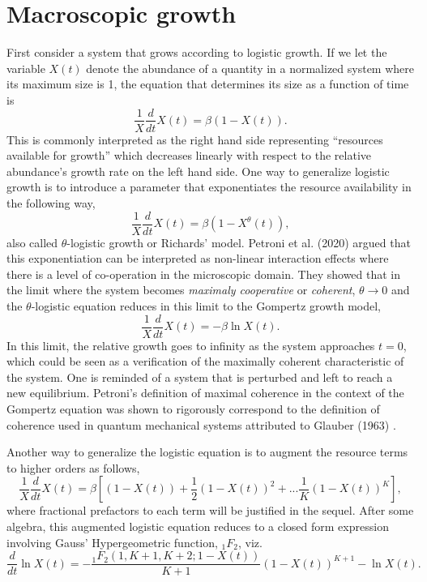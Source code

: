 \documentclass{article}
\begin{document}
\section{Macroscopic growth}
\label{sec:macro}

First consider a system that grows according to logistic growth. If we let the variable $X(t)$ denote the abundance of a quantity in a normalized system where its maximum size is 1, the equation that determines its size as a function of time is
\begin{equation}
  \frac{1}{X}\frac{d}{dt} X(t) = \beta (1 - X(t)).
\end{equation}
This is commonly interpreted as the right hand side representing ``resources available for growth'' which decreases linearly with respect to the relative abundance's growth rate on the left hand side. One way to generalize logistic growth is to introduce a parameter that exponentiates the resource availability in the following way,
\begin{equation}
\label{eq:Rich}
  \frac{1}{X}\frac{d}{dt} X(t) = \beta (1 - X^{\theta}(t)),
\end{equation}
also called $\theta$-logistic growth or Richards' model. Petroni et al. (2020) argued that this exponentiation can be interpreted as non-linear interaction effects where there is a level of co-operation in the microscopic domain. They showed that in the limit where the system becomes \textit{maximaly cooperative} or \textit{coherent}, $\theta\rightarrow 0$ and the $\theta$-logistic equation reduces in this limit to the Gompertz growth model,
 \begin{equation}
 \label{eq:Gomp}
  \frac{1}{X}\frac{d}{dt} X(t) = - \beta \ln X(t).
\end{equation}
In this limit, the relative growth goes to infinity as the system approaches $t=0$, which could be seen as a verification of the maximally coherent characteristic of the system. One is reminded of a system that is perturbed and left to reach a new equilibrium. Petroni's definition of maximal coherence in the context of the Gompertz equation was shown to rigorously correspond to the definition of coherence used in quantum mechanical systems \cite{molski2003coherent} attributed to Glauber (1963) \cite{glauber1963coherent}.

Another way to generalize the logistic equation is to augment the resource terms to higher orders as follows,
\begin{equation}
  \frac{1}{X}\frac{d}{dt} X(t) = \beta \left[(1 - X(t)) + \frac{1}{2}(1 - X(t))^2 + ... \frac{1}{K}(1 - X(t))^K\right],
\end{equation}
where fractional prefactors to each term will be justified in the sequel.
After some algebra, this augmented logistic equation reduces to a closed form expression involving Gauss' Hypergeometric function, ${}_1F_{2}$, viz.
\begin{equation}
 \label{eq:modLogistic}
\frac{d}{dt}\ln{X(t)} = - \frac{{}_{1}F_{2}({1,K+1,K+2;1-X(t)})}{K+1}(1-X(t))^{K+1} - \ln{X(t)}.
 \end{equation}
\end{document}
